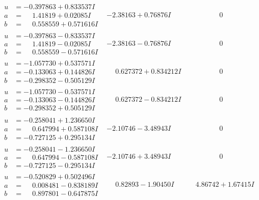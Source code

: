 \documentclass[1p]{elsarticle_modified}
\theoremstyle{definition}
\begin{document}
$$\begin{array}{c|c|c}
\begin{aligned}
u &= -0.397863 + 0.833537 I \\
a &= \phantom{-}1.41819 + 0.02085 I \\
b &= \phantom{-}0.558559 + 0.571616 I\end{aligned}
 & -2.38163 + 0.76876 I & \phantom{-0.000000 } 0 \\ \hline\begin{aligned}
u &= -0.397863 - 0.833537 I \\
a &= \phantom{-}1.41819 - 0.02085 I \\
b &= \phantom{-}0.558559 - 0.571616 I\end{aligned}
 & -2.38163 - 0.76876 I & \phantom{-0.000000 } 0 \\ \hline\begin{aligned}
u &= -1.057730 + 0.537571 I \\
a &= -0.133063 + 0.144826 I \\
b &= -0.298352 - 0.505129 I\end{aligned}
 & \phantom{-}0.627372 + 0.834212 I & \phantom{-0.000000 } 0 \\ \hline\begin{aligned}
u &= -1.057730 - 0.537571 I \\
a &= -0.133063 - 0.144826 I \\
b &= -0.298352 + 0.505129 I\end{aligned}
 & \phantom{-}0.627372 - 0.834212 I & \phantom{-0.000000 } 0 \\ \hline\begin{aligned}
u &= -0.258041 + 1.236650 I \\
a &= \phantom{-}0.647994 + 0.587108 I \\
b &= -0.727125 + 0.295134 I\end{aligned}
 & -2.10746 - 3.48943 I & \phantom{-0.000000 } 0 \\ \hline\begin{aligned}
u &= -0.258041 - 1.236650 I \\
a &= \phantom{-}0.647994 - 0.587108 I \\
b &= -0.727125 - 0.295134 I\end{aligned}
 & -2.10746 + 3.48943 I & \phantom{-0.000000 } 0 \\ \hline\begin{aligned}
u &= -0.520829 + 0.502496 I \\
a &= \phantom{-}0.008481 - 0.838189 I \\
b &= \phantom{-}0.897801 - 0.647875 I\end{aligned}
 & \phantom{-}0.82893 - 1.90450 I & \phantom{-}4.86742 + 1.67415 I \\ \hline\begin{aligned}

\end{aligned}
\end{array}$$
\end{document}
